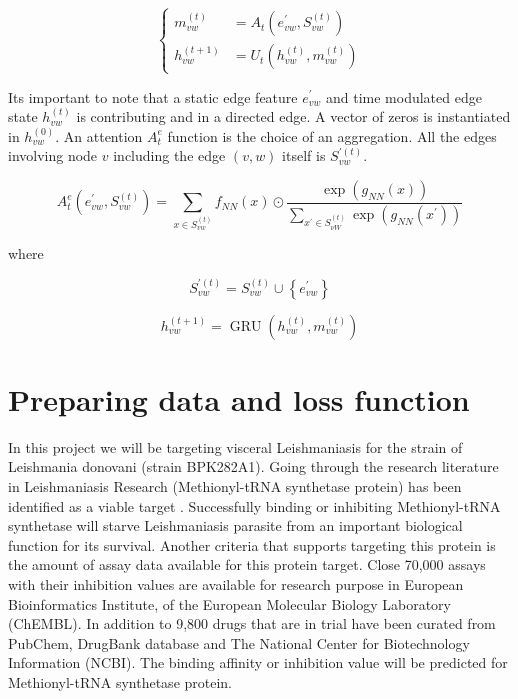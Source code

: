 \documentclass[10pt,twocolumn,letterpaper]{article}
\begin{document}
\begin{equation}
\left\{\begin{aligned}
m_{v w}^{(t)} &=A_{t}\left(e_{v w}^{\prime}, S_{v w}^{(t)}\right) \\
h_{v w}^{(t+1)} &=U_{t}\left(h_{v w}^{(t)}, m_{v w}^{(t)}\right)
\end{aligned}\right.
\end{equation}

Its important to note that a static edge feature $e_{v w}^{\prime}$ and time modulated edge state $h_{v w}^{(t)}$ is contributing and in a directed edge. A vector of zeros is instantiated in $h_{v w}^{(0)}$. An attention $A_{t}^{e}$ function is the choice of an aggregation. All the edges involving node $v$ including the edge $(v, w)$ itself is $S_{v w}^{\prime(t)}$. 


\begin{equation}
A_{t}^{e}\left(e_{v w}^{\prime}, S_{v w}^{(t)}\right)=\sum_{x \in S_{v w}^{(t)}} f_{N N}(x) \odot \frac{\exp \left(g_{N N}(x)\right)}{\sum_{x^{\prime} \in S_{\nu W}^{(t)}} \exp \left(g_{N N}\left(x^{\prime}\right)\right)}
\end{equation}

where 

$$
S_{v w}^{\prime(t)}=S_{v w}^{(t)} \cup\left\{e_{v w}^{\prime}\right\}
$$



\begin{equation}
h_{v w}^{(t+1)}=\operatorname{GRU}\left(h_{v w}^{(t)}, m_{v w}^{(t)}\right)
\end{equation}




\section{Preparing data and loss function}


In this project we will be targeting visceral Leishmaniasis for the strain of Leishmania donovani (strain BPK282A1). Going through the research literature in Leishmaniasis Research (Methionyl-tRNA synthetase protein) has been identified as a viable target \cite{Barrett2012} \cite{T.Jacobs2011}. Successfully binding or inhibiting Methionyl-tRNA synthetase will starve Leishmaniasis parasite from an important biological function for its survival. Another criteria that supports targeting this protein is the amount of assay data available for this protein target. Close 70,000 assays with their inhibition values are available for research purpose in European Bioinformatics Institute, of the European Molecular Biology Laboratory (ChEMBL). In addition to 9,800 drugs that are in trial have been curated from PubChem, DrugBank database and The National Center for Biotechnology Information (NCBI). The binding affinity or inhibition value will be predicted for Methionyl-tRNA synthetase protein.
\end{document}
